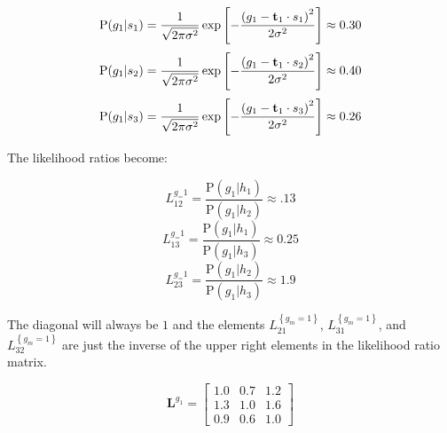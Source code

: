 \begin{equation}
    \mbox{P}(g_1|s_1)
    =
    \frac
    {
        1
    }
    {
        \sqrt{2\pi \sigma^2}
    }
    \exp{
    \left[
        -
        \frac
        {
        \left( g_1 -  \displaystyle \mathbf{t} _1 \cdot s_1 \right)^2
        }
        {
        2 \sigma^2
        }
    \right]
    }
    \approx
    0.30
\end{equation}
\begin{equation}
    \mbox{P}(g_1|s_2)
    =
    \frac
    {
        1
    }
    {
        \sqrt{2\pi \sigma^2}
    }
    \exp{
    \left[
        -
        \frac
        {
        \left( g_1 -  \displaystyle \mathbf{t} _1 \cdot s_2 \right)^2
        }
        {
        2 \sigma^2
        }
    \right]
    }
    \approx
    0.40
\end{equation}
\begin{equation}
    \mbox{P}(g_1|s_3)
    =
    \frac
    {
        1
    }
    {
        \sqrt{2\pi \sigma^2}
    }
    \exp{
    \left[
        -
        \frac
        {
        \left( g_1 -  \displaystyle \mathbf{t} _1 \cdot s_3 \right)^2
        }
        {
        2 \sigma^2
        }
    \right]
    }
    \approx
    0.26
\end{equation}


The likelihood ratios become:

\begin{equation}
    L_{12}^{ g_=1 }
    =
    \frac
    {
        \mbox{P}(g_1|h_1)
    }
    {
        \mbox{P}(g_1|h_2)
    }
    \approx
    .13
\end{equation}
\begin{equation}
    L_{13}^{ g_=1 }
    =
    \frac
    {
        \mbox{P}(g_1|h_1)
    }
    {
        \mbox{P}(g_1|h_3)
    }
    \approx
    0.25
\end{equation}
\begin{equation}
    L_{23}^{ g_=1 }
    =
    \frac
    {
        \mbox{P}(g_1|h_2)
    }
    {
        \mbox{P}(g_1|h_3)
    }
    \approx
    1.9
\end{equation}

The diagonal will always be $1$ and the elements $L_{21}^{\left\{ g_m=1 \right\}}$, $L_{31}^{\left\{ g_m=1 \right\}}$, and $L_{32}^{\left\{ g_m=1 \right\}}$ are just the inverse of the upper right elements in the likelihood ratio matrix.

\begin{equation}
    \mathbf{L}^{g_1}
    =
    \begin{bmatrix}
      1.0  & 0.7 & 1.2 \\
      1.3  & 1.0 & 1.6 \\
      0.9  & 0.6 & 1.0
    \end{bmatrix}
\end{equation}

